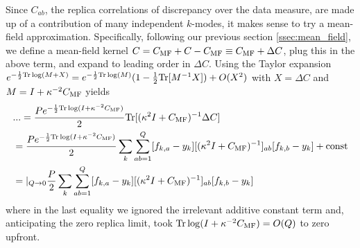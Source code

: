 Since $C_{ab}$, the replica correlations of discrepancy over the data measure, are made up of a contribution of many independent $k$-modes, it makes sense to try a mean-field approximation. Specifically, following our previous section  \ref{ssec:mean_field}, we define a mean-field kernel $C=C_{\text{MF}}+C-C_{\text{MF}}\equiv C_{\text{MF}}+\Delta C$, plug this in the above term, and expand to leading order in $\Delta C$. Using the Taylor expansion $e^{-\frac{1}{2}\text{Tr}\log(M+X)}=e^{-\frac{1}{2} \text{Tr}\log(M)}(1-\frac{1}{2}\text{Tr}[M^{-1}X])+O(X^2)$ with $X=\Delta C$ and $M=I+\kappa^{-2} C_{\text{MF}}$ yields 
\begin{align}
&... = \frac{Pe^{-\frac{1}{2}\text{Tr}\log(I+\kappa^{-2}C_{\text{MF}})}}{2} \text{Tr}[(\kappa^2 I+C_{\text{MF}})^{-1}\Delta C] \\ \nonumber &= \frac{Pe^{-\frac{1}{2}\text{Tr}\log(I+\kappa^{-2}C_{\text{MF}})}}{2} \sum_k \sum_{ab=1}^Q [f_{k,a}-y_k][(\kappa^2 I+C_{\text{MF}})^{-1}]_{ab}[f_{k,b}-y_k] + \text{const} \\ \nonumber 
&=|_{Q \rightarrow 0}\frac{P}{2} \sum_k \sum_{ab=1}^Q [f_{k,a}-y_k][(\kappa^2 I+C_{\text{MF}})^{-1}]_{ab}[f_{k,b}-y_k] \end{align}
where in the last equality we ignored the irrelevant additive constant term and, anticipating the zero replica limit, took $\text{Tr}\log(I+\kappa^{-2}C_{\text{MF}})=O(Q)$ to zero upfront. 

